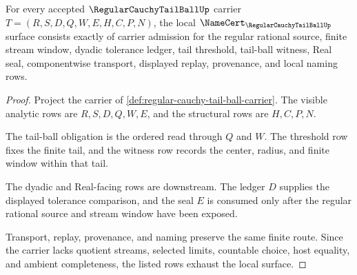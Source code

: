 \begin{theorem}
\label{thm:regular-cauchy-tail-ball-namecert-obligations}
For every accepted $\RegularCauchyTailBallUp$ carrier $T=(R,S,D,Q,W,E,H,C,P,N)$, the local $\NameCert_{\RegularCauchyTailBallUp}$ surface consists exactly of carrier admission for the regular rational source, finite stream window, dyadic tolerance ledger, tail threshold, tail-ball witness, Real seal, componentwise transport, displayed replay, provenance, and local naming rows.
\end{theorem}
\begin{proof}
Project the carrier of \autoref{def:regular-cauchy-tail-ball-carrier}. The visible analytic rows are $R,S,D,Q,W,E$, and the structural rows are $H,C,P,N$.

The tail-ball obligation is the ordered read through $Q$ and $W$. The threshold row fixes the finite tail, and the witness row records the center, radius, and finite window within that tail.

The dyadic and Real-facing rows are downstream. The ledger $D$ supplies the displayed tolerance comparison, and the seal $E$ is consumed only after the regular rational source and stream window have been exposed.

Transport, replay, provenance, and naming preserve the same finite route. Since the carrier lacks quotient streams, selected limits, countable choice, host equality, and ambient completeness, the listed rows exhaust the local surface.
\end{proof}

